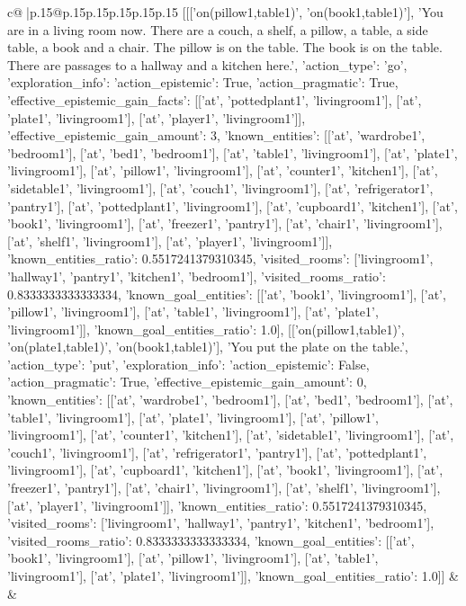 \documentclass{article}
\begin{document}
{\begin{supertabular}{c@{$\;$}|p{.15\linewidth}@{}p{.15\linewidth}p{.15\linewidth}p{.15\linewidth}p{.15\linewidth}p{.15\linewidth}}
{{{	 [[['on(pillow1,table1)', 'on(book1,table1)'], 'You are in a living room now. There are a couch, a shelf, a pillow, a table, a side table, a book and a chair. The pillow is on the table. The book is on the table. There are passages to a hallway and a kitchen here.', {'action_type': 'go', 'exploration_info': {'action_epistemic': True, 'action_pragmatic': True, 'effective_epistemic_gain_facts': [['at', 'pottedplant1', 'livingroom1'], ['at', 'plate1', 'livingroom1'], ['at', 'player1', 'livingroom1']], 'effective_epistemic_gain_amount': 3, 'known_entities': [['at', 'wardrobe1', 'bedroom1'], ['at', 'bed1', 'bedroom1'], ['at', 'table1', 'livingroom1'], ['at', 'plate1', 'livingroom1'], ['at', 'pillow1', 'livingroom1'], ['at', 'counter1', 'kitchen1'], ['at', 'sidetable1', 'livingroom1'], ['at', 'couch1', 'livingroom1'], ['at', 'refrigerator1', 'pantry1'], ['at', 'pottedplant1', 'livingroom1'], ['at', 'cupboard1', 'kitchen1'], ['at', 'book1', 'livingroom1'], ['at', 'freezer1', 'pantry1'], ['at', 'chair1', 'livingroom1'], ['at', 'shelf1', 'livingroom1'], ['at', 'player1', 'livingroom1']], 'known_entities_ratio': 0.5517241379310345, 'visited_rooms': ['livingroom1', 'hallway1', 'pantry1', 'kitchen1', 'bedroom1'], 'visited_rooms_ratio': 0.8333333333333334, 'known_goal_entities': [['at', 'book1', 'livingroom1'], ['at', 'pillow1', 'livingroom1'], ['at', 'table1', 'livingroom1'], ['at', 'plate1', 'livingroom1']], 'known_goal_entities_ratio': 1.0}}], [['on(pillow1,table1)', 'on(plate1,table1)', 'on(book1,table1)'], 'You put the plate on the table.', {'action_type': 'put', 'exploration_info': {'action_epistemic': False, 'action_pragmatic': True, 'effective_epistemic_gain_amount': 0, 'known_entities': [['at', 'wardrobe1', 'bedroom1'], ['at', 'bed1', 'bedroom1'], ['at', 'table1', 'livingroom1'], ['at', 'plate1', 'livingroom1'], ['at', 'pillow1', 'livingroom1'], ['at', 'counter1', 'kitchen1'], ['at', 'sidetable1', 'livingroom1'], ['at', 'couch1', 'livingroom1'], ['at', 'refrigerator1', 'pantry1'], ['at', 'pottedplant1', 'livingroom1'], ['at', 'cupboard1', 'kitchen1'], ['at', 'book1', 'livingroom1'], ['at', 'freezer1', 'pantry1'], ['at', 'chair1', 'livingroom1'], ['at', 'shelf1', 'livingroom1'], ['at', 'player1', 'livingroom1']], 'known_entities_ratio': 0.5517241379310345, 'visited_rooms': ['livingroom1', 'hallway1', 'pantry1', 'kitchen1', 'bedroom1'], 'visited_rooms_ratio': 0.8333333333333334, 'known_goal_entities': [['at', 'book1', 'livingroom1'], ['at', 'pillow1', 'livingroom1'], ['at', 'table1', 'livingroom1'], ['at', 'plate1', 'livingroom1']], 'known_goal_entities_ratio': 1.0}}]] 
	  } 
	   } 
	   } 
	 & & \\ 
 


\end{supertabular}}
\end{document}
